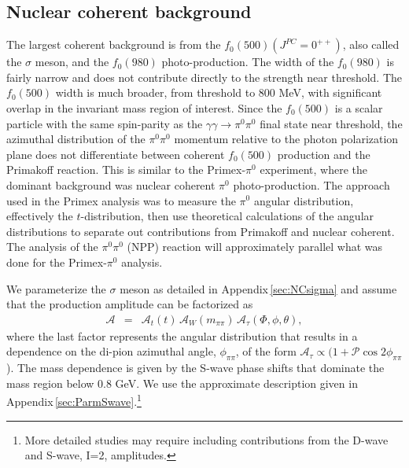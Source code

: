 \subsection{Nuclear coherent background \label{sec:NCback}}
   
 The largest coherent background is  
from the $f_0(500)(J^{PC}=0^{++})$, also called the $\sigma$ meson, and the $f_0(980)$ photo-production.  The width of the
$f_0(980)$ is fairly narrow and does not contribute directly to the strength near threshold.
The $f_0(500)$ width is much
broader, from threshold to 800 MeV, with significant overlap in the
invariant mass region of interest.  Since the $f_0(500)$ is a scalar
particle with the same spin-parity as the $\gamma \gamma \rightarrow
\pi^0\pi^0$ final state near threshold, the azimuthal distribution of the $\pi^0\pi^0$ momentum relative to the
photon polarization plane does not differentiate between coherent
$f_0(500)$ production and the Primakoff reaction.  
This is similar to the Primex-$\pi^0$ experiment, where the dominant background was
nuclear coherent $\pi^0$ photo-production.  The approach used in the
Primex analysis was to measure the $\pi^0$ angular distribution,
effectively the $t$-distribution, then use theoretical calculations of
the angular distributions to separate out contributions from Primakoff
and nuclear coherent. The analysis of the $\pi^0\pi^0$ (NPP) reaction
will approximately parallel what was done for the Primex-$\pi^0$
analysis.  

We parameterize the $\sigma$ meson as detailed in Appendix\,\ref{sec:NCsigma} and assume that the production amplitude can be factorized as
\begin{eqnarray}
\mathcal{A} & = & \mathcal{A}_t(t) \, \mathcal{A}_W(m_{\pi\pi}) \, \mathcal{A}_\tau(\Phi, \phi, \theta),
\end{eqnarray}
where the last factor represents the angular distribution that results in a 
dependence on the di-pion azimuthal angle, $\phi_{\pi\pi}$, of the form $\mathcal{A}_\tau \propto (1 + \mathcal{P} \cos{2\phi_{\pi\pi}}$). 
The mass dependence is given by the S-wave phase shifts that dominate the mass region below 0.8 GeV. We use the approximate description given in 
Appendix\,\ref{sec:ParmSwave}.\footnote{More detailed studies may require including contributions from the D-wave and S-wave, I=2, amplitudes.} 

